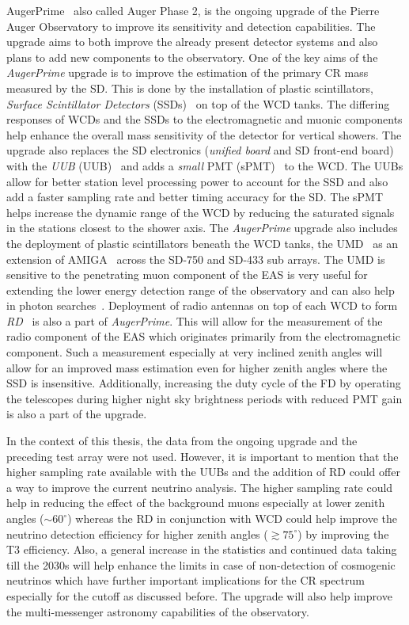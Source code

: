 AugerPrime~\cite{ANASTASI2022167497} also called Auger Phase 2,  is the ongoing upgrade of the Pierre Auger Observatory to improve its sensitivity and detection capabilities. The upgrade aims to both improve the already present detector systems and also plans to add new components to the observatory. One of the key aims of the \textit{AugerPrime} upgrade is to improve the estimation of the primary CR mass measured by the SD. This is done by the installation of plastic scintillators, \textit{Surface Scintillator Detectors} (SSDs)~\cite{Cataldi:2021uwd} on top of the WCD tanks. The differing responses of WCDs and the SSDs to the electromagnetic and muonic components help enhance the overall mass sensitivity of the detector for vertical showers. The upgrade also replaces the SD electronics (\textit{unified board} and SD front-end board) with the \textit{\acrlong{UUB}} (\acrshort{UUB})~\cite{PierreAuger:2021nnx} and adds a \textit{small} PMT (sPMT)~\cite{PierreAuger:2023clx} to the WCD. The UUBs allow for better station level processing power to account for the SSD and also add a faster sampling rate and better timing accuracy for the SD. The sPMT helps increase the dynamic range of the WCD by reducing the saturated signals in the stations closest to the shower axis. The \textit{AugerPrime} upgrade also includes the deployment of plastic scintillators beneath the WCD tanks, the \acrshort{UMD}~\cite{AbdulHalim:2023ZF} as an extension of AMIGA~\cite{PierreAuger:2021fhj} across the SD-750 and SD-433 sub arrays. The UMD is sensitive to the penetrating muon component of the EAS is very useful for extending the lower energy detection range of the observatory and can also help in photon searches~\cite{PierreAuger:2023nkh}. Deployment of radio antennas on top of each WCD to form \textit{\acrlong{RD}}~\cite{Horandel:2023XL} is also a part of \textit{AugerPrime}. This will allow for the measurement of the radio component of the EAS which originates primarily from the electromagnetic component. Such a measurement especially at very inclined zenith angles will allow for an improved mass estimation even for higher zenith angles where the SSD is insensitive. Additionally, increasing the duty cycle of the FD by operating the telescopes during higher night sky brightness periods with reduced PMT gain is also a part of the upgrade. 

In the context of this thesis, the data from the ongoing upgrade and the preceding test array were not used. However, it is important to mention that the higher sampling rate available with the UUBs and the addition of RD could offer a way to improve the current neutrino analysis. The higher sampling rate could help in reducing the effect of the background muons especially at lower zenith angles ($\sim 60^{\circ}$) whereas the RD in conjunction with WCD could help improve the neutrino detection efficiency for higher zenith angles ($\gtrsim 75^{\circ}$) by improving the T3 efficiency. Also, a general increase in the statistics and continued data taking till the 2030s will help enhance the limits in case of non-detection of cosmogenic neutrinos which have further important implications for the CR spectrum especially for the cutoff as discussed before. The upgrade will also help improve the multi-messenger astronomy capabilities of the observatory. 

